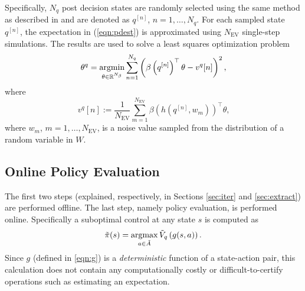 Specifically, $N_q$ post decision states are randomly selected using the same method as described in  and are denoted as $q^{[n]}$, $n=1,\ldots, N_q$. For each sampled state $q^{[n]}$, the expectation in (\ref{eqn:pdest}) is approximated using $N_{\text{EV}}$ single-step simulations. The results are used to solve a least squares optimization problem
\begin{equation}
    \theta^q = \underset{\theta \in \reals^{N_{\beta}}}{\argmin} \sum_{n=1}^{N_q} \left( \beta \left(q^{[n]}\right)^\top \theta - v^q[n]\right) ^2 \text{,}
\end{equation}
where
\begin{equation}
    v^q[n] := \frac{1}{N_{\text{EV}}} \sum_{m=1}^{N_{\text{EV}}} \beta\left(h\left(q^{[n]},w_m\right)\right)^\top \theta \text{,}
\end{equation}
where $w_m$, $m=1,\dots,N_\text{EV}$, is a noise value sampled from the distribution of a random variable in $W$.


\subsection{Online Policy Evaluation} \label{sec:policy}

The first two steps (explained, respectively, in Sections \ref{sec:iter} and \ref{sec:extract}) are performed offline. The last step, namely policy evaluation, is performed online. Specifically a suboptimal control at any state $s$ is computed  as
\begin{equation}\label{eq:post}
    \tilde{\pi}(s) = \underset{a \in \tilde{A}}{\argmax} \, \tilde{V}_q\left(g(s,a)\right) \text{.}
\end{equation}
Since $g$ (defined in \eqref{eqn:g}) is a \emph{deterministic} function of a state-action pair, this calculation does not contain any computationally costly or difficult-to-certify operations such as estimating an expectation.

